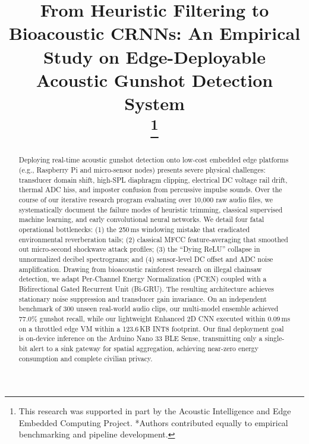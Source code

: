 \documentclass[conference]{IEEEtran}
\begin{document}
\title{From Heuristic Filtering to Bioacoustic CRNNs: An Empirical Study on Edge-Deployable Acoustic Gunshot Detection System\\
\thanks{This research was supported in part by the Acoustic Intelligence and Edge Embedded Computing Project. *Authors contributed equally to empirical benchmarking and pipeline development.}
}

\author{
}

\maketitle

\begin{abstract}
Deploying real-time acoustic gunshot detection onto low-cost embedded edge platforms (e.g., Raspberry Pi and micro-sensor nodes) presents severe physical challenges: transducer domain shift, high-SPL diaphragm clipping, electrical DC voltage rail drift, thermal ADC hiss, and imposter confusion from percussive impulse sounds. Over the course of our iterative research program evaluating over 10,000 raw audio files, we systematically document the failure modes of heuristic trimming, classical supervised machine learning, and early convolutional neural networks. We detail four fatal operational bottlenecks: (1) the 250\,ms windowing mistake that eradicated environmental reverberation tails; (2) classical MFCC feature-averaging that smoothed out micro-second shockwave attack profiles; (3) the ``Dying ReLU'' collapse in unnormalized decibel spectrograms; and (4) sensor-level DC offset and ADC noise amplification. Drawing from bioacoustic rainforest research on illegal chainsaw detection, we adapt Per-Channel Energy Normalization (PCEN) coupled with a Bidirectional Gated Recurrent Unit (Bi-GRU). The resulting architecture achieves stationary noise suppression and transducer gain invariance. On an independent benchmark of 300 unseen real-world audio clips, our multi-model ensemble achieved 77.0\% gunshot recall, while our lightweight Enhanced 2D CNN executed within 0.09\,ms on a throttled edge VM within a 123.6\,KB INT8 footprint. Our final deployment goal is on-device inference on the Arduino Nano 33 BLE Sense, transmitting only a single-bit alert to a sink gateway for spatial aggregation, achieving near-zero energy consumption and complete civilian privacy.
\end{abstract}
\end{document}
